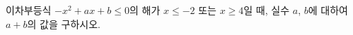 \hspace*{2mm}\begin{minipage}[t]{\dimexpr\linewidth-2mm\relax}\vspace{0pt}
이차부등식 $-x^2+ax+b\le 0$의 해가 $x\le -2$ 또는 $x\ge 4$일 때, 실수 $a$, $b$에 대하여 $a+b$의 값을 구하시오.\end{minipage}
